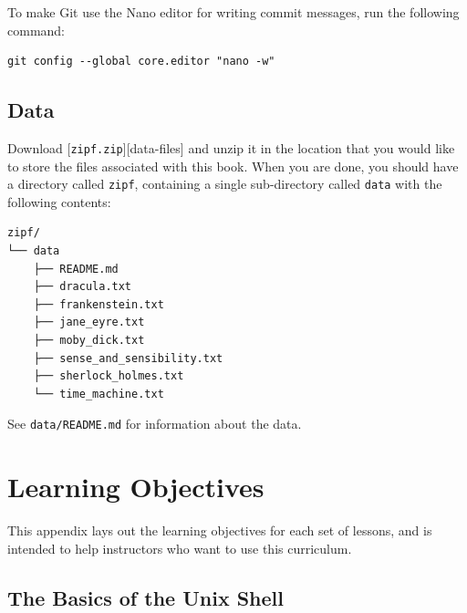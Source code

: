 \documentclass[
]{krantz}
\begin{document}
To make Git use the Nano editor for writing commit messages,
run the following command:

\begin{verbatim}
git config --global core.editor "nano -w"
\end{verbatim}

\hypertarget{install-data}{%
\section{Data}\label{install-data}}

Download {[}\texttt{zipf.zip}{]}{[}data-files{]} and unzip it in the location that you would like
to store the files associated with this book.
When you are done,
you should have a directory called \texttt{zipf},
containing a single sub-directory called \texttt{data}
with the following contents:

\begin{verbatim}
zipf/
└── data
    ├── README.md
    ├── dracula.txt
    ├── frankenstein.txt
    ├── jane_eyre.txt
    ├── moby_dick.txt
    ├── sense_and_sensibility.txt
    ├── sherlock_holmes.txt
    └── time_machine.txt
\end{verbatim}

See \texttt{data/README.md} for information about the data.

\hypertarget{objectives}{%
\chapter{Learning Objectives}\label{objectives}}

This appendix lays out the learning objectives for each set of lessons,
and is intended to help instructors who want to use this curriculum.

\hypertarget{the-basics-of-the-unix-shell}{%
\section{The Basics of the Unix Shell}\label{the-basics-of-the-unix-shell}}
\end{document}
